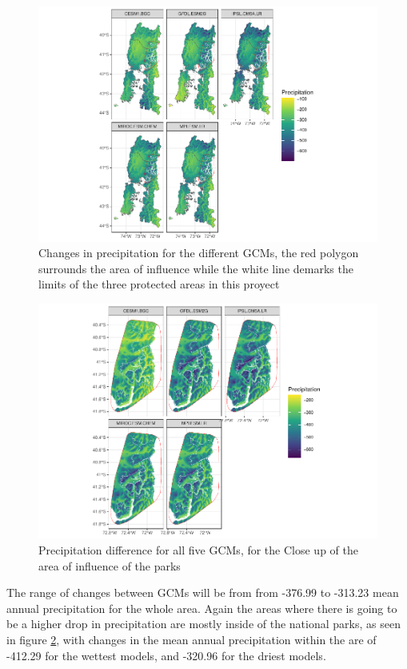 \documentclass[]{article}
\begin{document}
\begin{figure}
\centering
\includegraphics{Review_and_climate_files/figure-latex/DifPrec-1.pdf}
\caption{\label{fig:DifPrec}Changes in precipitation for the different GCMs, the red polygon surrounds the area of influence while the white line demarks the limits of the three protected areas in this proyect}
\end{figure}

\begin{figure}
\centering
\includegraphics{Review_and_climate_files/figure-latex/DifPrecHull-1.pdf}
\caption{\label{fig:DifPrecHull}Precipitation difference for all five GCMs, for the Close up of the area of influence of the parks}
\end{figure}

The range of changes between GCMs will be from from -376.99 to -313.23 mean annual precipitation for the whole area. Again the areas where there is going to be a higher drop in precipitation are mostly inside of the national parks, as seen in figure \ref{fig:DifPrecHull}, with changes in the mean annual precipitation within the are of -412.29 for the wettest models, and -320.96 for the driest models.
\end{document}
